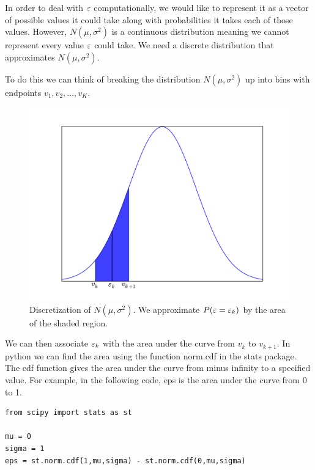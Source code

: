 In order to deal with $\varepsilon$ computationally, we would like to represent it as a vector of possible values it could take along with probabilities it takes each of those values.  However, $N(\mu,\sigma^2)$ is a continuous distribution meaning we cannot represent every value $\varepsilon$ could take.  We need a discrete distribution that approximates $N(\mu,\sigma^2)$.

To do this we can think of breaking the distribution $N(\mu,\sigma^2)$ up into bins with endpoints $v_1,v_2,\ldots, v_K$.

\begin{figure}[h!]
\label{stoch1_fig1}
\begin{center}
\includegraphics[scale = 0.5]{discnorm.pdf}
\end{center}
\caption{Discretization of $N(\mu,\sigma^2)$.  We approximate $P(\varepsilon = \varepsilon_k)$ by the area of the shaded region.}
\end{figure}

We can then associate $\varepsilon_k$ with the area under the curve from $v_k$ to $v_{k+1}$.  In python we can find the area using the function norm.cdf in the stats package.  The cdf function gives the area under the curve from minus infinity to a specified value.  For example, in the following code, eps is the area under the curve from 0 to 1.

\begin{lstlisting}[style=python]
from scipy import stats as st

mu = 0
sigma = 1
eps = st.norm.cdf(1,mu,sigma) - st.norm.cdf(0,mu,sigma)
\end{lstlisting}

